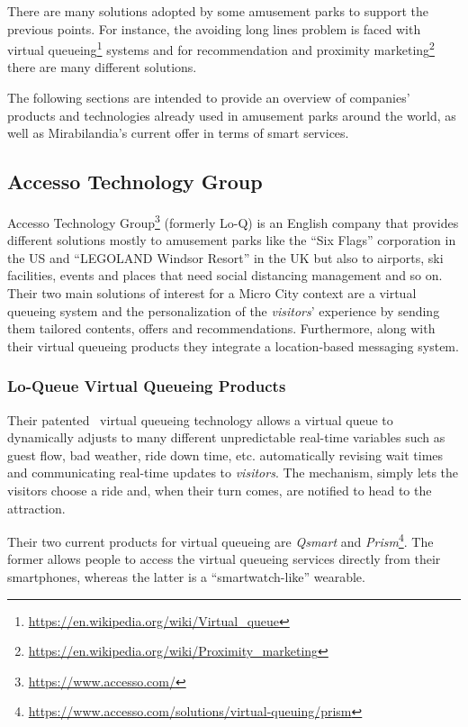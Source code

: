 There are many solutions adopted by some amusement parks to support the previous points.
For instance, the avoiding long lines problem is faced with virtual queueing\footnote{\url{https://en.wikipedia.org/wiki/Virtual_queue}} systems
and for recommendation and proximity marketing\footnote{\url{https://en.wikipedia.org/wiki/Proximity_marketing}} there are many different solutions.

The following sections are intended to provide an overview of companies' products and technologies already used in amusement parks around the world,
as well as Mirabilandia's current offer in terms of smart services.

\subsection{Accesso Technology Group}\label{subsec:accesso-technology-group}
Accesso Technology Group\footnote{\url{https://www.accesso.com/}} (formerly Lo-Q) is an English company that provides different solutions
mostly to amusement parks like the ``Six Flags'' corporation in the US and ``LEGOLAND Windsor Resort'' in the UK but also to airports,
ski facilities, events and places that need social distancing management and so on.
Their two main solutions of interest for a Micro City context are a virtual queueing system and the personalization of
the \textit{visitors}' experience by sending them tailored contents, offers and recommendations.
Furthermore, along with their virtual queueing products they integrate a location-based messaging system.

\subsubsection{Lo-Queue Virtual Queueing Products}
Their patented~\cite{q-management-system-patent} \cite{q-system-patent}
virtual queueing technology allows a virtual queue to dynamically adjusts to many different unpredictable real-time variables such
as guest flow, bad weather, ride down time, etc.
automatically revising wait times and communicating real-time updates to \textit{visitors}.
The mechanism, simply lets the visitors choose a ride and, when their turn comes, are notified to head to the attraction.

Their two current products for virtual queueing are \textit{Qsmart} and \textit{Prism}\footnote{\url{https://www.accesso.com/solutions/virtual-queuing/prism}}.
The former allows people to access the virtual queueing services directly from their smartphones, whereas the latter is a ``smartwatch-like''
wearable.

